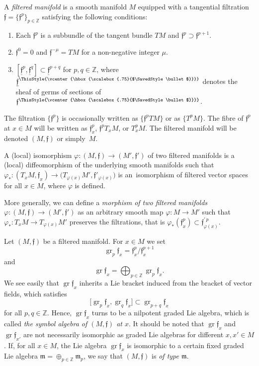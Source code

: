 \documentclass[pdftex]{sigma}%
\newcommand\sbullet[1][.75]{\mathbin{\ThisStyle{\vcenter{\hbox{%
					\scalebox{#1}{$\SavedStyle\bullet$}}}}}%
}
\newcommand{\Z}{\mathbb Z}
\newcommand{\f}{\mathfrak f}
\newcommand{\uf}{\underline{\f}}
\newcommand{\m}{\mathfrak m}
\newcommand{\gr}{\operatorname{gr}}
\numberwithin{equation}{section}
\begin{document}
A \emph{filtered manifold} is a smooth manifold $M$ equipped with a tangential filtration $\f=\{\f^p\}_{p\in\Z}$ satisfying the following conditions:
\begin{enumerate}\itemsep=0pt
	\item[$(i)$] Each $\f^p$ is a subbundle of the tangent bundle $TM$ and $\f^p\supset \f^{p+1}$.
	\item[$(ii)$] $\f^0=0$ and $\f^{-\mu}=TM$ for a non-negative integer $\mu$.
	\item[$(iii)$] $[\uf^p,\uf^q]\subset\uf^{p+q}$ for $p,q\in\Z$, where $\uf^{\sbullet}$ denotes the sheaf of germs of sections of $\f^{\sbullet}$.
\end{enumerate}
The filtration $\{\f^p\}$ is occasionally written as $\{\f^pTM\}$ or as $\{T^pM\}$. The fibre of
$\f^p$ at $x\in M$ will be written as $\f^p_x$, $\f^pT_xM$, or $T^p_xM$. The filtered manifold will be denoted $(M,\f)$ or simply~$M$.

A (local) isomorphism $\varphi\colon (M,\f)\to (M',\f')$ of two filtered manifolds is a (local) diffeomorphism of the underlying smooth manifolds such that
$\varphi_*\colon (T_xM, \f_x) \to \big(T_{\varphi(x)}M', \f'_{\varphi(x)}\big)$ is an~iso\-mor\-phism of filtered vector spaces for all $x\in M$, where $\varphi$ is defined.

More generally, we can define a \emph{morphism of two filtered manifolds} $\varphi\colon (M,\f)\to (M',\f')$ as an arbitrary smooth map $\varphi\colon M\to M'$ such that $\varphi_*\colon T_x M\to T_{\varphi(x)} M'$ preserves the filtrations, that is $\varphi_*(\f_x^p)\subset \f^{\prime\,p}_{\varphi(x)}$.

Let $(M,\f)$ be a filtered manifold. For $x\in M$ we set
\[
\gr_p\f_x = \f^p_x/\f^{p+1}_x
\]
and
\[
\gr \f_x =\bigoplus_{p\in \Z} \gr_p\f_x.
\]
We see easily that $\gr\f_x$ inherits a Lie bracket induced from the bracket of vector fields, which satisfies
\[
\big[\gr_p\f_x,\gr_q\f_x\big]\subset \gr_{p+q}\f_x
\]
for all $p,q\in\Z$. Hence, $\gr\f_x$ turns to be a nilpotent graded Lie algebra, which is called \emph{the symbol algebra of $(M,\f)$ at $x$}. It should be noted that $\gr\f_x$ and $\gr\f_{x'}$ are not necessarily isomorphic as graded Lie algebras for different $x,x'\in M$. If, for all $x\in M$, the Lie algebra $\gr\f_x$ is isomorphic to a certain fixed graded Lie algebra $\m=\oplus_{p\in\Z}\m_p$, we say that $(M,\f)$ is \emph{of type $\m$}.
\end{document}

